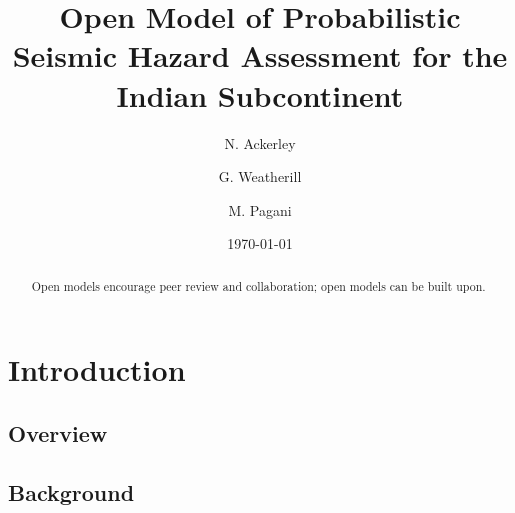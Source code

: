 \documentclass{article}
\begin{document}
\title{Open Model of Probabilistic Seismic Hazard Assessment for the Indian Subcontinent}
\date{\today}

\setcounter{Maxaffil}{0} %
\author[1,2]{N. Ackerley}
\author[3]{G. Weatherill}
\author[3]{M. Pagani}

\maketitle

\begin{abstract}
Open models encourage peer review and collaboration; open models can be built upon.
\end{abstract}

\tableofcontents
\listoffigures
\listoftables

\section{Introduction}
\label{sec:Introduction}

\subsection{Overview}
\label{sec:Overview}

\subsection{Background}
\label{sec:Background}
\end{document}

